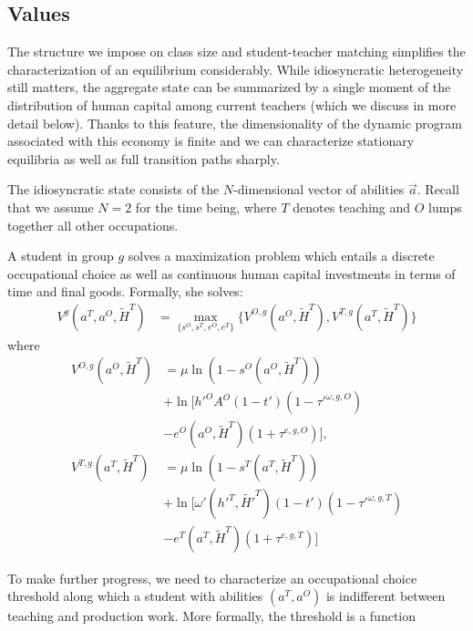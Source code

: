 \documentclass[onehalfspacing,11pt]{article}
\begin{document}
\subsection{Values}
The structure we impose on class size and student-teacher matching simplifies the characterization of an equilibrium considerably. While idiosyncratic heterogeneity still matters, the aggregate state can be summarized by a single moment of the distribution of human capital among current teachers (which we discuss in more detail below). Thanks to this feature, the dimensionality of the dynamic program associated with this economy is finite and we can characterize stationary equilibria as well as full transition paths sharply.

The idiosyncratic state consists of the $N$-dimensional vector of abilities $\vec{a}$. Recall that we assume $N=2$ for the time being, where $T$ denotes teaching and $O$ lumps together all other occupations.

A student in group $g$ solves a maximization problem which entails a discrete occupational choice as well as continuous human capital investments in terms of time and final goods. Formally, she solves:
\begin{align}
V^g(a^T,a^O,\widetilde{H}^T) & = \max_{\{s^{O},s^{T},e^{O},e^{T}\}} \bigg\{ V^{O,g}(a^O,\widetilde{H}^T), V^{T,g}(a^T,\widetilde{H}^T) \bigg\} \label{eq:V}
\end{align}
where
\begin{align}
V^{O,g}(a^O,\widetilde{H}^T) & = \mu \ln\left(1-s^O\left(a^O,\widetilde{H}^T\right)\right) \nonumber \\
& + \ln \Big[ {{h'}^{O}} A^O(1-t')(1-{{\tau'}^{\omega,g,O}}) \nonumber \\
& - e^O(a^O,\widetilde{H}^T)(1+\tau^{e,g,O}) \Big], \label{eq:VO} \\
V^{T,g}(a^T,\widetilde{H}^T) & = \mu \ln\left(1-s^T\left(a^T,\widetilde{H}^T\right)\right) \nonumber \\
& + \ln \Big[ \omega'({{h'}^{T}},{\widetilde{H'}^{T}})(1-t')(1-{{\tau'}^{\omega,g,T}}) \nonumber \\
& - e^T(a^T,\widetilde{H}^T)(1+{\tau}^{e,g,T}) \Big] \label{eq:VT}
\end{align}

To make further progress, we need to characterize an occupational choice threshold along which a student with abilities $(a^T,a^O)$ is indifferent between teaching and production work. More formally, the threshold is a function
\end{document}
